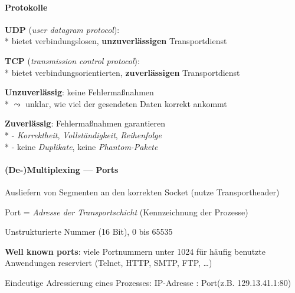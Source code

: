 \paragraph{Protokolle}
\begin{items}
  \item \textbf{UDP} (\emph{user datagram protocol}): \\*
    bietet verbindungslosen, \textbf{unzuverlässigen} Transportdienst
  \item \textbf{TCP} (\emph{transmission control protocol}): \\*
    bietet verbindungsorientierten, \textbf{zuverlässigen} Transportdienst
    \medskip
  \item \textbf{Unzuverlässig}: keine Fehlermaßnahmen\\*
    \( \leadsto \) unklar, wie viel der gesendeten Daten korrekt ankommt
  \item \textbf{Zuverlässig}: Fehlermaßnahmen garantieren\\*
    - \emph{Korrektheit}, \emph{Vollständigkeit}, \emph{Reihenfolge} \\*
    - keine \emph{Duplikate}, keine \emph{Phantom-Pakete}
\end{items}

\paragraph{(De-)Multiplexing --- Ports}
\begin{items}
\item Ausliefern von Segmenten an den korrekten Socket (nutze Transportheader)
  \item Port = \emph{Adresse der Transportschicht} (Kennzeichnung der Prozesse)
  \item Unstrukturierte Nummer (16 Bit), 0 bis 65535
  \item \textbf{Well known ports}: viele Portnummern unter 1024 für häufig benutzte Anwendungen reserviert (Telnet, HTTP, SMTP, FTP, \dots)
  \medskip
  \item Eindeutige Adressierung eines Prozesses: \dq IP-Adresse : Port\dq (z.B. 129.13.41.1:80)
\end{items}

